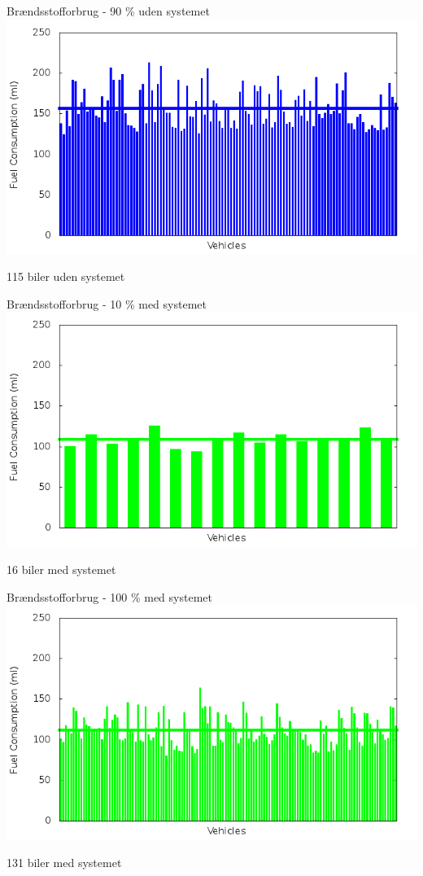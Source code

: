 \begin{frame}{Brændsstofforbrug - 90 \% uden systemet}
\includegraphics[width=1\textwidth]{../Article/images/tp0/fuelRouteUncontrolled10.png}

115 biler uden systemet
\end{frame}

\begin{frame}{Brændsstofforbrug - 10 \% med systemet}
\includegraphics[width=1\textwidth]{../Article/images/tp0/fuelRouteControlled10.png}

16 biler med systemet
\end{frame}

\begin{frame}{Brændsstofforbrug - 100 \% med systemet}
\includegraphics[width=1\textwidth]{../Article/images/tp0/fuelRouteControlled100.png}

131 biler med systemet
\end{frame}

